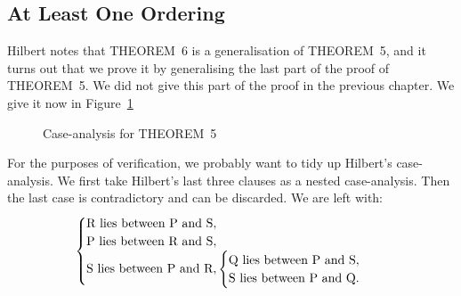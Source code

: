 \subsection{At Least One Ordering}
Hilbert notes that THEOREM~6 is a generalisation of THEOREM~5, and it turns out that we prove it by generalising the last part of the proof of THEOREM~5. We did not give this part of the proof in the previous chapter. We give it now in Figure~\ref{fig:Theorem5Cases}

\begin{figure}
\caption{Case-analysis for THEOREM~5}
\label{fig:Theorem5Cases}
\end{figure}

For the purposes of verification, we probably want to tidy up Hilbert's case-analysis. We first take Hilbert's last three clauses as a nested case-analysis. Then the last case is contradictory and can be discarded. We are left with:
\begin{displaymath}
\begin{cases}
$R$ \text{ lies between } $P$ \text{ and } $S$,\\
$P$ \text{ lies between } $R$ \text{ and } $S$,\\
$S$ \text{ lies between } $P$ \text{ and } $R$,
\begin{cases}
  $Q$ \text{ lies between } $P$ \text{ and } $S$,\\
  $S$ \text{ lies between } $P$ \text{ and } $Q$.
\end{cases}
\end{cases}
\end{displaymath}

